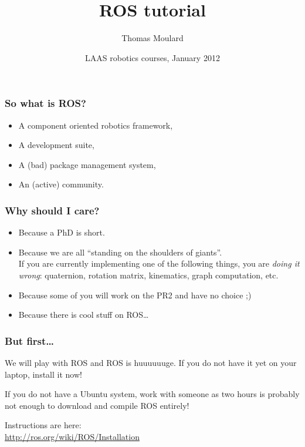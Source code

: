 \documentclass[hyperref={pdfpagelabels=false}]{beamer}
\title{ROS tutorial}
\author[T. Moulard]{Thomas Moulard}
\date[January 2012]{LAAS robotics courses, January 2012}
\begin{document}
\maketitle

\begin{frame}
  \frametitle{So what is ROS?}

  \begin{itemize}
    \item A component oriented robotics framework,
    \item A development suite,
    \item A (bad) package management system,
    \item An (active) community.
  \end{itemize}
\end{frame}

\begin{frame}
  \frametitle{Why should I care?}

  \begin{itemize}
    \item Because a PhD is short.

    \item Because we are all ``standing on the shoulders of
      giants''.\\ If you are currently implementing one of the
      following things, you are \textit{doing it wrong}: quaternion,
      rotation matrix, kinematics, graph computation, etc.

      \item Because some of you will work on the PR2 and have no
        choice ;)

      \item Because there is cool stuff on ROS\ldots
  \end{itemize}
\end{frame}

\begin{frame}
  \frametitle{But first\ldots}

  We will play with ROS and ROS is huuuuuuge. If you do not have it
  yet on your laptop, install it now!

  If you do not have a Ubuntu system, work with someone as two hours
  is probably not enough to download and compile ROS entirely!

  \vspace{0.5cm}

  Instructions are here:\\
  \url{http://ros.org/wiki/ROS/Installation}
\end{frame}
\end{document}
